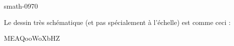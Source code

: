 
\begin{corrige}{smath-0970}

    Le dessin très schématique (et pas spécialement à l'échelle) est comme ceci :

MEAQooWoXbHZ

\end{corrige}
